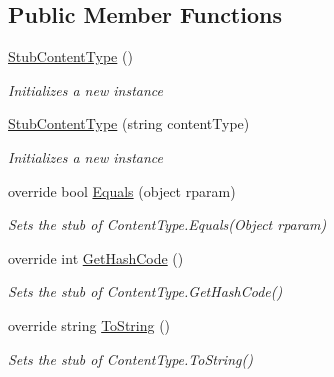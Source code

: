\subsection*{Public Member Functions}
\begin{DoxyCompactItemize}
\item 
\hyperlink{class_system_1_1_net_1_1_mime_1_1_fakes_1_1_stub_content_type_ad241ba69b00964f84522e2070a39bf7e}{Stub\-Content\-Type} ()
\begin{DoxyCompactList}\small\item\em Initializes a new instance\end{DoxyCompactList}\item 
\hyperlink{class_system_1_1_net_1_1_mime_1_1_fakes_1_1_stub_content_type_a2cc151b748816c865a589e5d027f750c}{Stub\-Content\-Type} (string content\-Type)
\begin{DoxyCompactList}\small\item\em Initializes a new instance\end{DoxyCompactList}\item 
override bool \hyperlink{class_system_1_1_net_1_1_mime_1_1_fakes_1_1_stub_content_type_ad06b62c5840fa3f9dc0240acdaa9bfe6}{Equals} (object rparam)
\begin{DoxyCompactList}\small\item\em Sets the stub of Content\-Type.\-Equals(\-Object rparam)\end{DoxyCompactList}\item 
override int \hyperlink{class_system_1_1_net_1_1_mime_1_1_fakes_1_1_stub_content_type_af001af176765be704d352c33090b02ec}{Get\-Hash\-Code} ()
\begin{DoxyCompactList}\small\item\em Sets the stub of Content\-Type.\-Get\-Hash\-Code()\end{DoxyCompactList}\item 
override string \hyperlink{class_system_1_1_net_1_1_mime_1_1_fakes_1_1_stub_content_type_a488c671fcb865f1f861602c635a11c17}{To\-String} ()
\begin{DoxyCompactList}\small\item\em Sets the stub of Content\-Type.\-To\-String()\end{DoxyCompactList}\end{DoxyCompactItemize}
